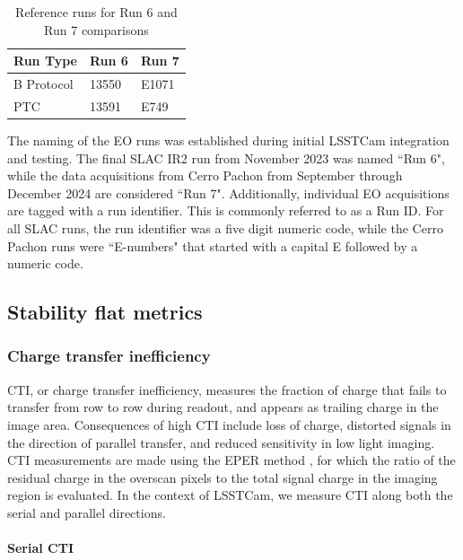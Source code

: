 \begin{table}[ht]
\centering
\caption{Reference runs for Run 6 and Run 7 comparisons} \label{runTable-b-ptc}
\begin{tabular}{lll}
\toprule
Run Type & Run 6 & Run 7 \\
\midrule
B Protocol & 13550 & E1071 \\
PTC        & 13591 & E749 \\
\bottomrule
\end{tabular}
\end{table}

The naming of the EO runs was established during initial LSSTCam
integration and testing. The final SLAC IR2 run from November 2023 was
named ``Run 6", while the data acquisitions from Cerro Pachon from September through December 2024 are considered ``Run 7". Additionally, individual EO acquisitions are tagged with a run identifier. This is commonly referred to as a Run ID. For all SLAC runs, the run identifier was a five digit numeric code, while the Cerro Pachon runs were ``E-numbers" that started with a capital E followed by a numeric code.


\subsection{Stability flat metrics}\label{stability-flat-metrics}

\subsubsection{Charge transfer
inefficiency}\label{charge-transfer-inefficiency}

CTI, or charge transfer inefficiency, measures the fraction of charge that fails to transfer from row to row during readout, and appears as trailing charge in the image area. Consequences of high CTI include loss of charge, distorted signals in the direction of parallel transfer, and reduced sensitivity in low light imaging. CTI measurements are made using the EPER method \citep{2021JATIS...7d8002S}, for which the ratio of the residual charge in the overscan pixels to the total signal charge in the imaging region is evaluated. In the context of LSSTCam, we measure CTI along both the serial and parallel directions.

\paragraph{Serial CTI}\label{serial-cti}

